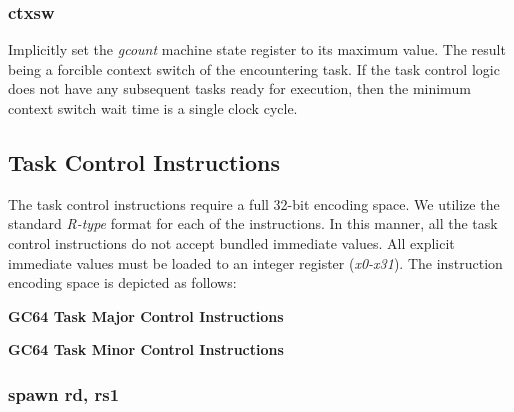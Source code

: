 \documentclass{article}
\begin{document}
\subsubsection{ctxsw}

Implicitly set the \emph{gcount} machine state register
to its maximum value.  The result being a forcible context
switch of the encountering task.  If the task control logic
does not have any subsequent tasks ready for execution, then the
minimum context switch wait time is a single clock cycle.  

\subsection{Task Control Instructions}

The task control instructions require a full 32-bit encoding space.  We utilize
the standard \emph{R-type} format for each of the instructions.  In this manner, 
all the task control instructions do not accept bundled immediate values.  All 
explicit immediate values must be loaded to an integer register (\emph{x0-x31}).
The instruction encoding space is depicted as follows: 

\begin{center}
\textbf{GC64 Task Major Control Instructions}
\makebox[0.03in][s]{}\makebox[0.03in][s]{}\makebox[0.03in][s]{}\makebox[0.03in][s]{}\makebox[0.03in][s]{}
\end{center}

\begin{center}
\textbf{GC64 Task Minor Control Instructions}
\makebox[0.03in][s]{}\makebox[0.03in][s]{}\makebox[0.03in][s]{}\makebox[0.03in][s]{}\makebox[0.03in][s]{}
\end{center}

\subsubsection{spawn rd, rs1}
\end{document}
